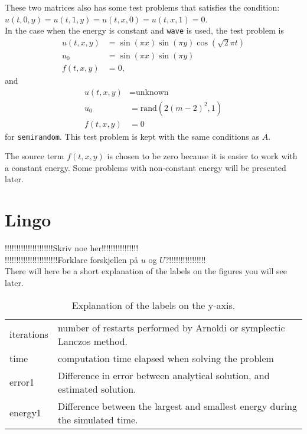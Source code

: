 These two matrices also has some test problems that satisfies the condition: $u(t,0,y) = u(t,1,y) = u(t,x,0) = u(t,x,1) = 0$. \\

In the case when the energy is constant and \texttt{wave} is used, the test problem is 
\begin{equation}
\begin{aligned}
u(t,x,y) &= \sin(\pi x) \sin(\pi y) \cos(\sqrt{2} \pi t) \\
u_0 &= \sin( \pi x) \sin(\pi y) \\
f(t,x,y) &= 0 ,
\end{aligned}
\end{equation}
and 
\begin{equation}
\begin{aligned}
u(t,x,y) &= \text{unknown} \\
u_0 &= \text{rand} (2 (m-2)^2,1) \\
f(t,x,y) &= 0
\end{aligned}
\end{equation}
for \texttt{semirandom}. This test problem is kept with the same conditions as $A$.

The source term $f(t,x,y)$ is chosen to be zero because it is easier to work with a constant energy. Some problems with non-constant energy will be presented later.


\section{Lingo}
!!!!!!!!!!!!!!!!!!!!!Skriv noe her!!!!!!!!!!!!!!!!\\
!!!!!!!!!!!!!!!!!!!!!!!Forklare forskjellen på $u$ og $U$?!!!!!!!!!!!!!!!!\\
There will here be a short explanation of the labels on the figures you will see later. 
\begin{table}[h]
\centering
\begin{tabular}{l|l}
 iterations& number of restarts performed by Arnoldi or symplectic Lanczos method.  \\
 time & computation time elapsed when solving the problem \\
 error1 &  Difference in error between analytical solution, and estimated solution. \\
 energy1 & Difference between the largest and smallest energy during the simulated time. \\
\end{tabular}
\caption{ Explanation of the labels on the y-axis. }
\label{tab:ylabels}
\end{table}

